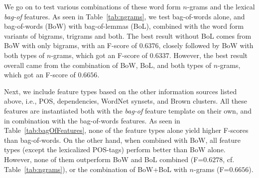 \documentclass[11pt,letterpaper]{article}
\begin{document}
We go on to test various combinations of these word form $n$-grams and the lexical \emph{bag-of} features. As seen in Table~\ref{tab:ngrams}, we test bag-of-words alone, and bag-of-words (BoW) with bag-of-lemmas (BoL), combined with the word form variants of bigrams, trigrams and both. The best result without BoL comes from BoW with only bigrams, with an F-score of $0.6376$, closely followed by BoW with both types of $n$-grams, which got an F-score of $0.6337$. However, the best result overall came from the combination of BoW, BoL, and both types of $n$-grams, which got an F-score of $0.6656$.

Next, we include feature types based on the other information sources listed above, i.e., POS, dependencies, WordNet synsets, and Brown clusters. All these features are instantiated both with the \emph{bag-of} feature template on their own, and in combination with the bag-of-words features. As seen in Table~\ref{tab:bagOfFeatures}, none of the feature types alone yield higher F-scores than bag-of-words. On the other hand, when combined with BoW, all feature types (except the lexicalized POS-tags) perform better than BoW alone. However, none of them outperform BoW and BoL combined (F=$0.6278$, cf. Table~\ref{tab:ngrams}), or the combination of BoW+BoL with $n$-grams (F=$0.6656$).
\end{document}
